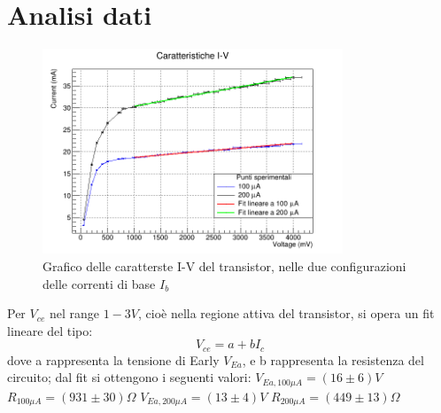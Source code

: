 \documentclass{article}
\begin{document}
\section{Analisi dati}
\begin{figure}[H]
    \centering
    \includegraphics[width=0.8\textwidth]{Multigraph.png}
    \caption{\label{fig:multigraph}Grafico delle caratterste I-V del transistor, nelle due configurazioni delle correnti di base $I_b$}
\end{figure}
Per $V_{ce}$ nel range $1-3 V$, cioè nella regione attiva del transistor, si opera un fit lineare del tipo:
\begin{equation}
    V_{ce} = a + b I_c 
\end{equation}
dove a rappresenta la tensione di Early $V_{Ea}$, e b rappresenta la resistenza del circuito; dal fit si ottengono i seguenti valori: \newline
$V_{Ea,100\mu A}=(16\pm 6) V$  $R_{100\mu A}=(931 \pm 30) \Omega$ \newline
$V_{Ea,200\mu A}=(13\pm 4) V$   $R_{200\mu A}=(449 \pm 13) \Omega$ \newline
\end{document}
